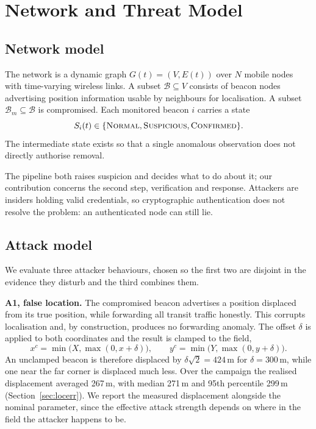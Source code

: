 \section{Network and Threat Model}
\label{sec:model}

\subsection{Network model}

The network is a dynamic graph $G(t) = (V, E(t))$ over $N$ mobile nodes with
time-varying wireless links. A subset $\mathcal{B} \subseteq V$ consists of beacon
nodes advertising position information usable by neighbours for
localisation. A subset $\mathcal{B}_m \subseteq \mathcal{B}$ is compromised.
Each monitored beacon $i$ carries a state
\begin{equation}
\label{eq:state}
S_i(t) \in \{\textsc{Normal}, \textsc{Suspicious}, \textsc{Confirmed}\}.
\end{equation}
The intermediate state exists so that a single anomalous observation does
not directly authorise removal.

The pipeline both raises suspicion and decides what to do about it; our
contribution concerns the second step, verification and response. Attackers are insiders
holding valid credentials, so cryptographic authentication does not resolve
the problem: an authenticated node can still lie.

\subsection{Attack model}

We evaluate three attacker behaviours, chosen so the first two are disjoint
in the evidence they disturb and the third combines them.

\textbf{A1, false location.} The compromised beacon advertises a position
displaced from its true position, while forwarding all transit traffic
honestly. This corrupts localisation and, by construction, produces no
forwarding anomaly. The offset $\delta$ is applied to both coordinates and
the result is clamped to the field,
\begin{equation}
\label{eq:clamp}
x^{c} = \min\bigl(X, \max(0, x + \delta)\bigr), \qquad
y^{c} = \min\bigl(Y, \max(0, y + \delta)\bigr).
\end{equation}
An unclamped beacon is therefore displaced by $\delta\sqrt{2} = 424$\,m for
$\delta = 300$\,m, while one near the far corner is displaced much less.
Over the campaign the realised displacement averaged 267\,m, with median
271\,m and 95th percentile 299\,m (Section~\ref{sec:locerr}). We report the
measured displacement alongside the nominal parameter, since the effective
attack strength depends on where in the field the attacker happens to be.

